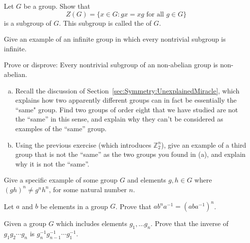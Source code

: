 \begin{exercise}{}
Let $G$ be a group. Show that
\[
Z(G) = \{ x \in G : gx = xg \mbox{ for all $g \in G$}
\}\label{centerofagroup} 
\]
is a subgroup of $G$. This subgroup is called the  of $G$. 
\end{exercise} 
 
 
\begin{exercise}{}
Give an example of an infinite group in which every nontrivial
subgroup is infinite.
\end{exercise}
 
\begin{exercise}{}
Prove or disprove: Every nontrivial subgroup of an non-abelian group is
non-abelian.
\end{exercise}  

\begin{exercise}{}\label{ex:eoc:11}
\begin{enumerate}[(a)]
\item
Recall the discussion of Section~\ref{sec:Symmetry:UnexplainedMiracle}, which explains how two apparently different groups can in fact be essentially the ``same" group. Find two groups of order eight that we have studied are not the ``same'' in this sense, and explain why they can't be considered as examples of the ``same'' group.  
\item
Using the previous exercise (which introduces ${\mathbb Z}_2^n$), give an example of a third group that is not the ``same'' as the two groups you found in (a), and explain why it is not the ``same''.
\end{enumerate}
\end{exercise}
 
\begin{exercise}{}
Give a specific example of some group $G$ and elements $g, h \in G$
where $(gh)^n \neq g^nh^n$, for some natural number $n$. 
\end{exercise} 
 

  
\begin{exercise}{}
Let $a$ and $b$ be elements in a group $G$.  Prove that $ab^na^{-1} =
(aba^{-1})^n$. 
\end{exercise}

\begin{exercise}{}\label{ex:eoc:15}
Given a group $G$ which includes elements $g_1,\ldots g_n$. Prove that the inverse of $g _1 g_2 \cdots g_n$ is $g_n^{-1}
g_{n-1}^{-1} \cdots g_1^{-1}$. 
\end{exercise} 
 
